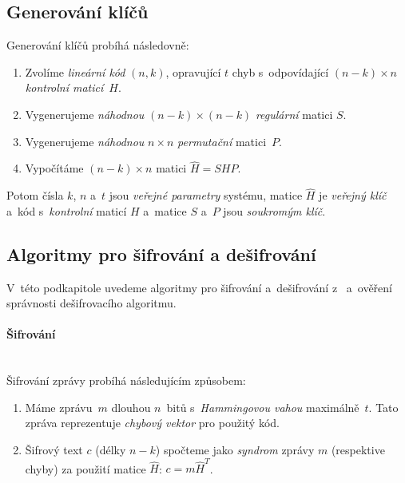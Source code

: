 \documentclass[thesis=M,czech,hidelinks]{FITthesis}[2012/06/26]
\newcommand{\0}{{\textcolor[gray]{0.75}{0}}}
\begin{document}
\subsection{Generování klíčů}

Generování klíčů probíhá následovně:

\begin{enumerate}
    \item Zvolíme \emph{lineární kód} $(n,k)$, opravující $t$ chyb
        s~odpovídající $(n-k) \times n$ \emph{kontrolní maticí}~$H$.
    \item Vygenerujeme \emph{náhodnou} $(n-k) \times (n-k)$ \emph{regulární}
        matici $S$.
    \item Vygenerujeme \emph{náhodnou} $n \times n$ \emph{permutační}
        matici~$P$.
    \item Vypočítáme $(n-k) \times n$ matici $\hat{H} = S H P$.
\end{enumerate}

Potom čísla $k$, $n$ a~$t$ jsou \emph{veřejné parametry} systému, matice
$\hat{H}$ je \emph{veřejný klíč} a~kód s~\emph{kontrolní} maticí $H$ a~matice
$S$ a~$P$ jsou \emph{soukromým klíč}.


\subsection{Algoritmy pro šifrování a dešifrování}

V~této podkapitole uvedeme algoritmy pro šifrování a~dešifrování
z~\cite{Niederreiter} a~ověření správnosti dešifrovacího algoritmu.


\paragraph{Šifrování} \hfill \\
Šifrování zprávy probíhá následujícím způsobem:

\begin{enumerate}
    \item Máme zprávu~$m$ dlouhou $n$~bitů s~\emph{Hammingovou vahou} maximálně~$t$.
        Tato zpráva reprezentuje \emph{chybový vektor} pro použitý kód.
    \item Šifrový text $c$ (délky $n-k$) spočteme jako \emph{syndrom} zprávy
        $m$ (respektive chyby) za použití matice $\hat{H}$: $c = m \hat{H}^T$.
\end{enumerate}
\end{document}
